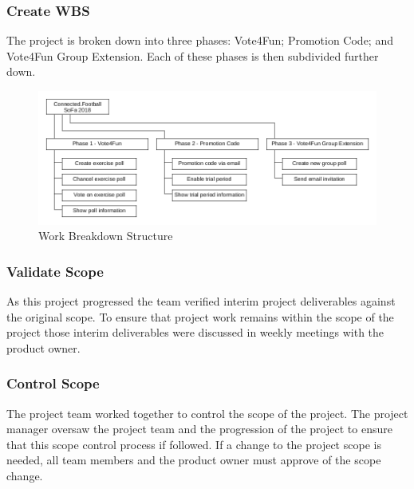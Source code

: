 \subsubsection{Create WBS}
\label{sssec:create_wbs}

The project is broken down into three phases: Vote4Fun; Promotion Code; and Vote4Fun Group Extension. Each of these phases is then subdivided further down.

\begin{figure}[H]
	\includegraphics[width=\textwidth]{images/wbs.png}
	\caption{Work Breakdown Structure}
    \label{fig:wbs}
\end{figure}

\subsubsection{Validate Scope}
\label{sssec:validate_scope}
    
As this project progressed the team verified interim project deliverables against the original scope. To ensure that project work remains within the scope of the project those interim deliverables were discussed in weekly meetings with the product owner.

\subsubsection{Control Scope}
\label{sssec:control_scope}

The project team worked together to control the scope of the project. The project manager oversaw the project team and the progression of the project to ensure that this scope control process if followed.
\newline
If a change to the project scope is needed, all team members and the product owner must approve of the scope change.



